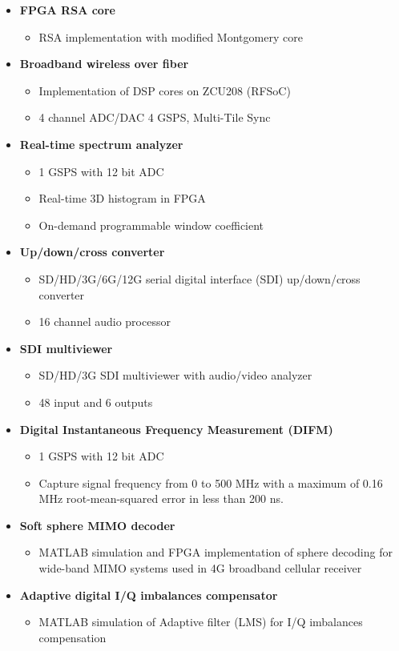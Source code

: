 
\begin{itemize}
	\item \textbf{FPGA RSA core}
	      \begin{itemize}
		      \item RSA implementation with modified Montgomery core
	      \end{itemize}
	\item \textbf{Broadband wireless over fiber}
	      \begin{itemize}
		      \item Implementation of DSP cores on ZCU208 (RFSoC)
		      \item 4 channel ADC/DAC 4 GSPS, Multi-Tile Sync
	      \end{itemize}
	\item \textbf{Real-time spectrum analyzer}
	      \begin{itemize}
		      \item 1 GSPS with 12 bit ADC
		      \item Real-time 3D histogram in FPGA
		      \item On-demand programmable window coefficient
	      \end{itemize}
	\item \textbf{Up/down/cross converter}
	      \begin{itemize}
		      \item SD/HD/3G/6G/12G serial digital interface (SDI) up/down/cross converter
		      \item 16 channel audio processor
	      \end{itemize}
	\item \textbf{SDI multiviewer}
	      \begin{itemize}
		      \item SD/HD/3G SDI multiviewer with audio/video analyzer
		      \item 48 input and 6 outputs
	      \end{itemize}
	\item \textbf{Digital Instantaneous Frequency Measurement (DIFM)}
	      \begin{itemize}
		      \item 1 GSPS with 12 bit ADC
		      \item Capture signal frequency from 0 to 500 MHz with a maximum of 0.16 MHz
		            root-mean-squared error in less than 200 ns.
	      \end{itemize}
	\item \textbf{Soft sphere MIMO decoder}
	      \begin{itemize}
		      \item MATLAB simulation and FPGA implementation of sphere decoding for wide-band
		            MIMO systems used in 4G broadband cellular receiver
	      \end{itemize}
	\item \textbf{Adaptive digital I/Q imbalances compensator}
	      \begin{itemize}
		      \item MATLAB simulation of Adaptive filter (LMS) for I/Q imbalances compensation
	      \end{itemize}
\end{itemize}
